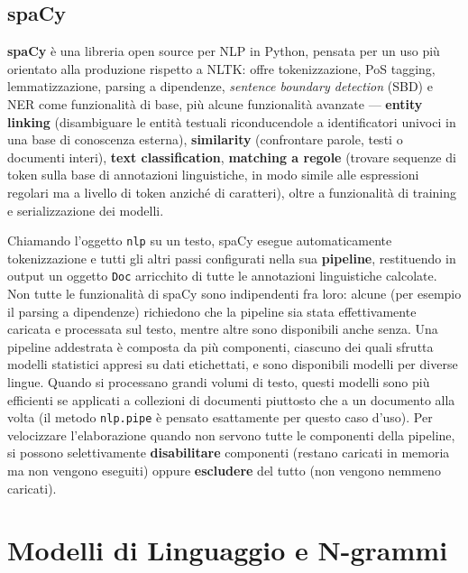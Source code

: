 \documentclass[11pt,a4paper]{report}
\begin{document}
\section{spaCy}

\textbf{spaCy} è una libreria open source per NLP in Python, pensata per un uso più orientato alla produzione rispetto a NLTK: offre tokenizzazione, PoS tagging, lemmatizzazione, parsing a dipendenze, \emph{sentence boundary detection} (SBD) e NER come funzionalità di base, più alcune funzionalità avanzate --- \textbf{entity linking} (disambiguare le entità testuali riconducendole a identificatori univoci in una base di conoscenza esterna), \textbf{similarity} (confrontare parole, testi o documenti interi), \textbf{text classification}, \textbf{matching a regole} (trovare sequenze di token sulla base di annotazioni linguistiche, in modo simile alle espressioni regolari ma a livello di token anziché di caratteri), oltre a funzionalità di training e serializzazione dei modelli.

Chiamando l'oggetto \texttt{nlp} su un testo, spaCy esegue automaticamente tokenizzazione e tutti gli altri passi configurati nella sua \textbf{pipeline}, restituendo in output un oggetto \texttt{Doc} arricchito di tutte le annotazioni linguistiche calcolate. Non tutte le funzionalità di spaCy sono indipendenti fra loro: alcune (per esempio il parsing a dipendenze) richiedono che la pipeline sia stata effettivamente caricata e processata sul testo, mentre altre sono disponibili anche senza. Una pipeline addestrata è composta da più componenti, ciascuno dei quali sfrutta modelli statistici appresi su dati etichettati, e sono disponibili modelli per diverse lingue. Quando si processano grandi volumi di testo, questi modelli sono più efficienti se applicati a collezioni di documenti piuttosto che a un documento alla volta (il metodo \texttt{nlp.pipe} è pensato esattamente per questo caso d'uso). Per velocizzare l'elaborazione quando non servono tutte le componenti della pipeline, si possono selettivamente \textbf{disabilitare} componenti (restano caricati in memoria ma non vengono eseguiti) oppure \textbf{escludere} del tutto (non vengono nemmeno caricati).

\chapter{Modelli di Linguaggio e N-grammi}
\end{document}
